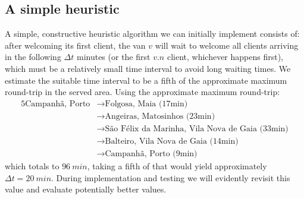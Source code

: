 \subsection{A simple heuristic} \label{algorithm-vrp-heuristic}
A simple, \gls{constructive} heuristic algorithm we can initially implement consists of: after welcoming its first client, the van $v$ will wait to welcome all clients arriving in the following $\Delta t$ minutes (or the first $v.n$ client, whichever happens first), which must be a relatively small time interval to avoid long waiting times. We estimate the suitable time interval to be a fifth of the approximate maximum round-trip in the served area. Using the approximate maximum round-trip:
\begin{alignat*}{5}
    \text{Campanhã, Porto}
    &\rightarrow \text{Folgosa, Maia (17min)} \\
    &\rightarrow\text{Angeiras, Matosinhos (23min)} \\
    &\rightarrow\text{São Félix da Marinha, Vila Nova de Gaia (33min)} \\
    &\rightarrow\text{Balteiro, Vila Nova de Gaia (14min)} \\
    &\rightarrow\text{Campanhã, Porto (9min)}
\end{alignat*}
which totals to $\SI{96}{min}$, taking a fifth of that would yield approximately $\Delta t = \SI{20}{min}$. During implementation and testing we will evidently revisit this value and evaluate potentially better values.
